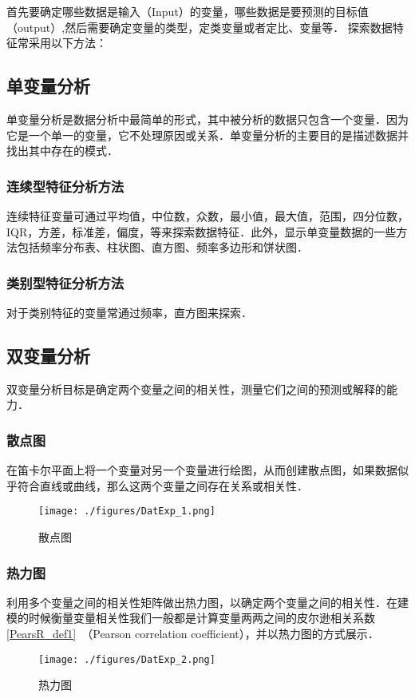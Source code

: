 \begin{issues}
\issueTODO
\end{issues}


首先要确定哪些数据是输入（Input）的变量，哪些数据是要预测的目标值（output）,然后需要确定变量的类型，定类变量或者定比、变量等．
探索数据特征常采用以下方法：
\subsection{单变量分析}
单变量分析是数据分析中最简单的形式，其中被分析的数据只包含一个变量．因为它是一个单一的变量，它不处理原因或关系．单变量分析的主要目的是描述数据并找出其中存在的模式．  
\subsubsection{连续型特征分析方法}
连续特征变量可通过平均值，中位数，众数，最小值，最大值，范围，四分位数，IQR，方差，标准差，偏度，等来探索数据特征．此外，显示单变量数据的一些方法包括频率分布表、柱状图、直方图、频率多边形和饼状图．
\subsubsection{类别型特征分析方法}
对于类别特征的变量常通过频率，直方图来探索．
\subsection{双变量分析}
双变量分析目标是确定两个变量之间的相关性，测量它们之间的预测或解释的能力．
\subsubsection{散点图}
在笛卡尔平面上将一个变量对另一个变量进行绘图，从而创建散点图，如果数据似乎符合直线或曲线，那么这两个变量之间存在关系或相关性．
\begin{figure}[ht]
\centering
\texttt{[image: ./figures/DatExp\_1.png]}
\caption{散点图} \label{DatExp_fig1}
\end{figure}
\subsubsection{热力图}
利用多个变量之间的相关性矩阵做出热力图，以确定两个变量之间的相关性．在建模的时候衡量变量相关性我们一般都是计算变量两两之间的皮尔逊相关系数\autoref{PearsR_def1}~（Pearson correlation coefficient），并以热力图的方式展示．
\begin{figure}[ht]
\centering
\texttt{[image: ./figures/DatExp\_2.png]}
\caption{热力图} \label{DatExp_fig2}
\end{figure}
